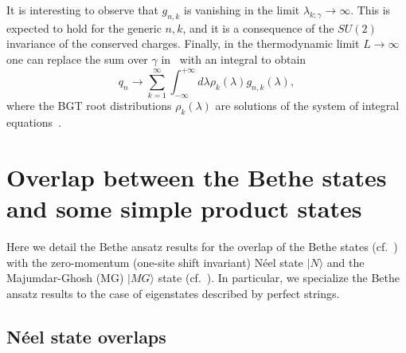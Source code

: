 \documentclass[11pt]{iopart}
\begin{document}
%
It is interesting to observe that $g_{n,k}$ is vanishing in the limit $\lambda_{k;\gamma}\to\infty$. 
This is expected to hold for the generic $n,k$, and it is a consequence of the $SU(2)$ invariance 
of the conserved charges. Finally, in the thermodynamic limit $L\to\infty$ one can replace the 
sum over $\gamma$ in~ with an integral to obtain  
%
\begin{equation}
\label{q0-th}
q_n\to\sum_{k=1}^\infty\int_{-\infty}^{+\infty}d\lambda\rho_k(\lambda)g_{n,k}(\lambda), 
\end{equation}
%
where the BGT root distributions $\rho_k(\lambda)$ are solutions of the system of integral 
equations~. 



\section{Overlap between the Bethe states and some simple product states} 
\label{sec:2}

Here we detail the Bethe ansatz results for the overlap of the Bethe states (cf.~) 
with the zero-momentum (one-site shift invariant) N\'eel state $|N\rangle$ 
and the Majumdar-Ghosh (MG) $|MG\rangle$ state (cf.~). In particular, we specialize 
the Bethe ansatz results to the case of eigenstates described by perfect strings. 

\subsection{N\'eel state overlaps}
\label{sec:2.1}
\end{document}

